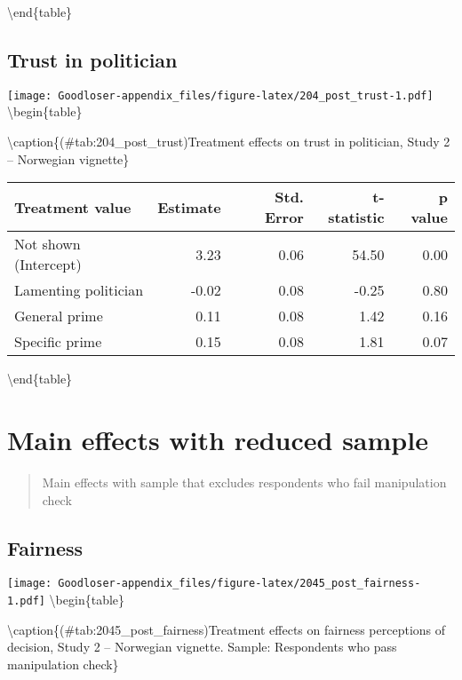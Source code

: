\documentclass[
]{book}
\begin{document}
\textbackslash end\{table\}

\hypertarget{trust-in-politician}{%
\section{Trust in politician}\label{trust-in-politician}}

\texttt{[image: Goodloser-appendix\_files/figure-latex/204\_post\_trust-1.pdf]} \textbackslash begin\{table\}

\textbackslash caption\{(\#tab:204\_post\_trust)Treatment effects on trust in politician, Study 2 -- Norwegian vignette\}
\centering

\begin{tabular}[t]{lrrrr}
\toprule
Treatment value & Estimate & Std. Error & t-statistic & p value\\
\midrule
Not shown (Intercept) & 3.23 & 0.06 & 54.50 & 0.00\\
Lamenting politician & -0.02 & 0.08 & -0.25 & 0.80\\
General prime & 0.11 & 0.08 & 1.42 & 0.16\\
Specific prime & 0.15 & 0.08 & 1.81 & 0.07\\
\bottomrule
\end{tabular}

\textbackslash end\{table\}

\hypertarget{main-effects-with-reduced-sample}{%
\chapter{Main effects with reduced sample}\label{main-effects-with-reduced-sample}}

\begin{quote}
Main effects with sample that excludes respondents who fail manipulation check
\end{quote}

\hypertarget{fairness-3}{%
\section{Fairness}\label{fairness-3}}

\texttt{[image: Goodloser-appendix\_files/figure-latex/2045\_post\_fairness-1.pdf]} \textbackslash begin\{table\}

\textbackslash caption\{(\#tab:2045\_post\_fairness)Treatment effects on fairness perceptions of decision, Study 2 -- Norwegian vignette. Sample: Respondents who pass manipulation check\}
\centering
\end{document}
